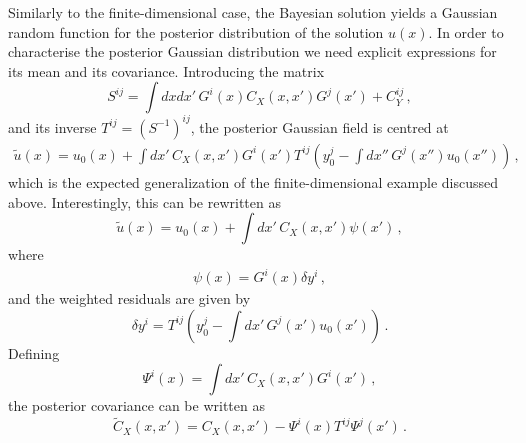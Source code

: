 Similarly to the finite-dimensional case, the Bayesian solution yields a Gaussian 
random function for the posterior distribution of the solution $u(x)$. In order to 
characterise the posterior Gaussian distribution we need explicit expressions for its mean
and its covariance. Introducing the matrix
\begin{equation}
  \label{eq:Smatrix}
  S^{ij} =
  \int dx dx'\, G^i(x) C_{X}(x,x') G^j(x') + C_{Y}^{ij}\, ,
\end{equation}
and its inverse $T^{ij}=\left(S^{-1}\right)^{ij}$, the posterior Gaussian field is centred at
\begin{align}
  \label{eq:PostMeanFunc}
  \tilde{u}(x) = u_0(x) + 
  \int dx'\, C_{X}(x,x') G^i(x') T^{ij} \left(
    y_0^j - \int dx''\, G^j(x'') u_0(x'') 
  \right)\, ,
\end{align}
which is the expected generalization of the finite-dimensional example discussed
above. Interestingly, this can be rewritten as
\begin{equation}
  \label{eq:TowardsBackus}
  \tilde{u}(x) = u_0(x) + 
  \int dx'\, C_{X}(x,x') \psi(x')\, ,
\end{equation}
where 
\begin{eqnarray}
  \label{eq:PsiDef}
  \psi(x) = G^i(x) \delta y^i\, ,
\end{eqnarray}
and the weighted residuals are given by
\begin{equation}
  \label{eq:DeltaYDef}
  \delta y^i = T^{ij} \left(
  y_0^j - \int dx'\, G^j(x') u_0(x')
  \right)\, .
\end{equation}
Defining 
\begin{equation}
  \label{eq:CapitalPsi}
  \Psi^i(x) = \int dx'\, C_{X}(x,x') G^i(x')\, ,
\end{equation}
the posterior covariance can be written as
\begin{equation}
  \label{eq:PostCovFunc}
  \tilde{C}_{X}(x,x') = 
  C_{X}(x,x') - \Psi^i(x) T^{ij} \Psi^j(x')\, .
\end{equation}

